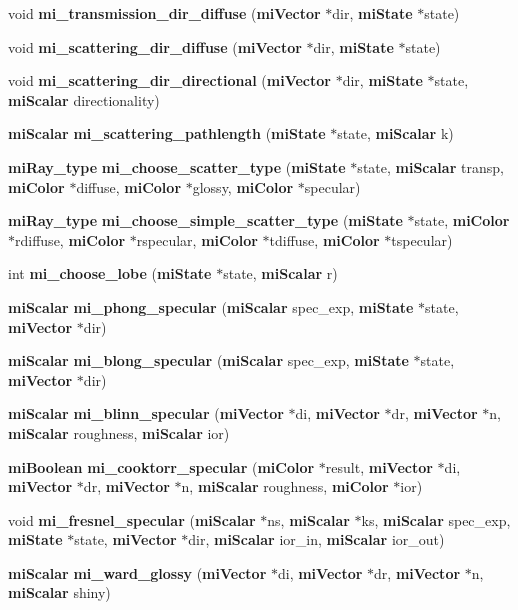 \begin{CompactItemize}
\item 
void {\bf mi\_\-transmission\_\-dir\_\-diffuse} ({\bf mi\-Vector} $\ast$dir, {\bf mi\-State} $\ast$state)
\item 
void {\bf mi\_\-scattering\_\-dir\_\-diffuse} ({\bf mi\-Vector} $\ast$dir, {\bf mi\-State} $\ast$state)
\item 
void {\bf mi\_\-scattering\_\-dir\_\-directional} ({\bf mi\-Vector} $\ast$dir, {\bf mi\-State} $\ast$state, {\bf mi\-Scalar} directionality)
\item 
{\bf mi\-Scalar} {\bf mi\_\-scattering\_\-pathlength} ({\bf mi\-State} $\ast$state, {\bf mi\-Scalar} k)
\item 
{\bf mi\-Ray\_\-type} {\bf mi\_\-choose\_\-scatter\_\-type} ({\bf mi\-State} $\ast$state, {\bf mi\-Scalar} transp, {\bf mi\-Color} $\ast$diffuse, {\bf mi\-Color} $\ast$glossy, {\bf mi\-Color} $\ast$specular)
\item 
{\bf mi\-Ray\_\-type} {\bf mi\_\-choose\_\-simple\_\-scatter\_\-type} ({\bf mi\-State} $\ast$state, {\bf mi\-Color} $\ast$rdiffuse, {\bf mi\-Color} $\ast$rspecular, {\bf mi\-Color} $\ast$tdiffuse, {\bf mi\-Color} $\ast$tspecular)
\item 
int {\bf mi\_\-choose\_\-lobe} ({\bf mi\-State} $\ast$state, {\bf mi\-Scalar} r)
\item 
{\bf mi\-Scalar} {\bf mi\_\-phong\_\-specular} ({\bf mi\-Scalar} spec\_\-exp, {\bf mi\-State} $\ast$state, {\bf mi\-Vector} $\ast$dir)
\item 
{\bf mi\-Scalar} {\bf mi\_\-blong\_\-specular} ({\bf mi\-Scalar} spec\_\-exp, {\bf mi\-State} $\ast$state, {\bf mi\-Vector} $\ast$dir)
\item 
{\bf mi\-Scalar} {\bf mi\_\-blinn\_\-specular} ({\bf mi\-Vector} $\ast$di, {\bf mi\-Vector} $\ast$dr, {\bf mi\-Vector} $\ast$n, {\bf mi\-Scalar} roughness, {\bf mi\-Scalar} ior)
\item 
{\bf mi\-Boolean} {\bf mi\_\-cooktorr\_\-specular} ({\bf mi\-Color} $\ast$result, {\bf mi\-Vector} $\ast$di, {\bf mi\-Vector} $\ast$dr, {\bf mi\-Vector} $\ast$n, {\bf mi\-Scalar} roughness, {\bf mi\-Color} $\ast$ior)
\item 
void {\bf mi\_\-fresnel\_\-specular} ({\bf mi\-Scalar} $\ast$ns, {\bf mi\-Scalar} $\ast$ks, {\bf mi\-Scalar} spec\_\-exp, {\bf mi\-State} $\ast$state, {\bf mi\-Vector} $\ast$dir, {\bf mi\-Scalar} ior\_\-in, {\bf mi\-Scalar} ior\_\-out)
\item 
{\bf mi\-Scalar} {\bf mi\_\-ward\_\-glossy} ({\bf mi\-Vector} $\ast$di, {\bf mi\-Vector} $\ast$dr, {\bf mi\-Vector} $\ast$n, {\bf mi\-Scalar} shiny)

\end{CompactItemize}

